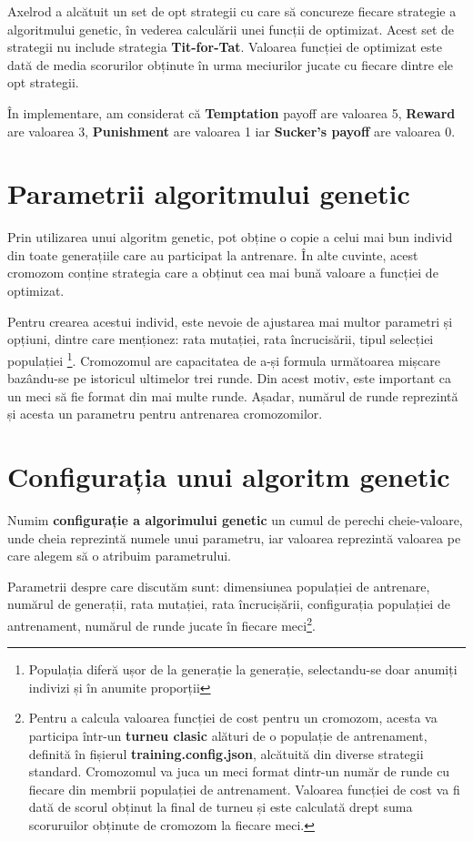 Axelrod a alcătuit un set de opt strategii cu care să concureze fiecare strategie a algoritmului genetic, în vederea calculării unei funcții de optimizat. Acest set de strategii nu include strategia \textbf{Tit-for-Tat}. Valoarea funcției de optimizat este dată de media scorurilor obținute în urma meciurilor jucate cu fiecare dintre ele opt strategii.

În implementare, am considerat că \textbf{Temptation} payoff are valoarea 5, \textbf{Reward} are valoarea 3, \textbf{Punishment} are valoarea 1 iar \textbf{Sucker's payoff} are valoarea 0\cite{optimal_strategies}. 

\section {Parametrii algoritmului genetic}

Prin utilizarea unui algoritm genetic, pot obține o copie a celui mai bun individ din toate generațiile care au participat la antrenare. În alte cuvinte, acest cromozom conține strategia care a obținut cea mai bună valoare a funcției de optimizat. 

Pentru crearea acestui individ, este nevoie de ajustarea mai multor parametri și opțiuni, dintre care menționez: rata mutației, rata încrucisării, tipul selecției populației \footnote{Populația diferă ușor de la generație la generație, selectandu-se doar anumiți indivizi și în anumite proporții}. Cromozomul are capacitatea de a-și formula următoarea mișcare bazându-se pe istoricul ultimelor trei runde. Din acest motiv, este important ca un meci să fie format din mai multe runde. Așadar, numărul de runde reprezintă și acesta un parametru pentru antrenarea cromozomilor. 

\section{Configurația unui algoritm genetic}

Numim \textbf{configurație a algorimului genetic} un cumul de perechi cheie-valoare, unde cheia reprezintă numele unui parametru, iar valoarea reprezintă valoarea pe care alegem să o atribuim parametrului.

Parametrii despre care discutăm sunt: dimensiunea populației de antrenare, numărul de generații, rata mutației, rata încrucișării, configurația populației de antrenament, numărul de runde jucate în fiecare meci\footnote{Pentru a calcula valoarea funcției de cost pentru un cromozom, acesta va participa într-un \textbf{turneu clasic} alături de o populație de antrenament, definită în fișierul \textbf{training.config.json}, alcătuită din diverse strategii standard. Cromozomul va juca un meci format dintr-un număr de runde cu fiecare din membrii populației de antrenament. Valoarea funcției de cost va fi dată de scorul obținut la final de turneu și este calculată drept suma scoruruilor obținute de cromozom la fiecare meci.}.  

